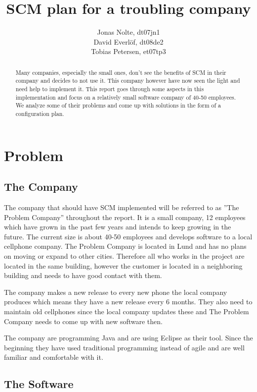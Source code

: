 \documentclass[a4paper,11pt]{article}
\title{SCM plan for a troubling company}
\author{Jonas Nolte, dt07jn1\\
David Everlöf, dt08de2\\
Tobias Petersen, et07tp3}
\begin{document}
\maketitle

\begin{abstract}
Many companies, especially the small ones, don't see the benefits of SCM in their company and decides to not use it.
This company however have now seen the light and need help to implement it.
This report goes through some aspects in this implementation and focus on a relatively small software company of 40-50 employees.
We analyze some of their problems and come up with solutions in the form of a configuration plan.
\end{abstract}
\newpage

\tableofcontents
\newpage

\section{Problem}

\subsection{The Company}

The company that should have SCM implemented will be referred to as ''The Problem Company'' throughout the report.
It is a small company, 12 employees which have grown in the past few years and intends to keep growing in the future.
The current size is about 40-50 employees and develops software to a local cellphone company. 
The Problem Company is located in Lund and has no plans on moving or expand to other cities. Therefore all who works in the project are located in the same building, however the customer is located in a neighboring building and needs to have good contact with them.

The company makes a new release to every new phone the local company produces which means they have a new release every 6 months.
They also need to maintain old cellphones since the local company updates these and The Problem Company needs to come up with new software then.

The company are programming Java and are using Eclipse as their tool.
Since the beginning they have used traditional programming instead of agile and are well familiar and comfortable with it.



\subsection{The Software}
\end{document}
